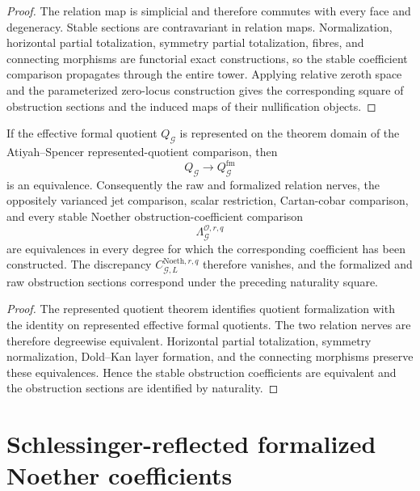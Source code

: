 \begin{proof}
The relation map is simplicial and therefore commutes with every face and
degeneracy.  Stable sections are contravariant in relation maps.  Normalization,
horizontal partial totalization, symmetry partial totalization, fibres, and connecting
morphisms are functorial exact constructions, so the stable coefficient comparison
propagates through the entire tower.  Applying relative zeroth space and the
parameterized zero-locus construction gives the corresponding square of
obstruction sections and the induced maps of their nullification objects.
\end{proof}

\begin{theorem}
\label{thm:symmetry-noether-represented-quotient-collapse}
If the effective formal quotient $Q_{\mathcal G}$ is represented on the theorem
domain of the Atiyah--Spencer represented-quotient comparison, then
\[
Q_{\mathcal G}\longrightarrow Q_{\mathcal G}^{\mathrm{fm}}
\]
is an equivalence.  Consequently the raw and formalized relation nerves, the
oppositely varianced jet comparison, scalar restriction, Cartan-cobar comparison,
and every stable Noether obstruction-coefficient comparison
\[
\boxed{
\Lambda_{\mathcal G}^{\mathcal O,r,q}
}
\]
are equivalences in every degree for which the corresponding coefficient has been
constructed.  The discrepancy
$C_{\mathcal G,L}^{\mathrm{Noeth},r,q}$ therefore vanishes, and the formalized and
raw obstruction sections correspond under the preceding naturality square.
\end{theorem}

\begin{proof}
The represented quotient theorem identifies quotient formalization with the
identity on represented effective formal quotients.  The two relation nerves are
therefore degreewise equivalent.  Horizontal partial totalization, symmetry
normalization, Dold--Kan layer formation, and the connecting morphisms preserve
these equivalences.  Hence the stable obstruction coefficients are equivalent and
the obstruction sections are identified by naturality.
\end{proof}


\section{Schlessinger-reflected formalized Noether coefficients}
\label{sec:symmetry-noether-schlessinger-reflected-formalized-noether-coefficients}

